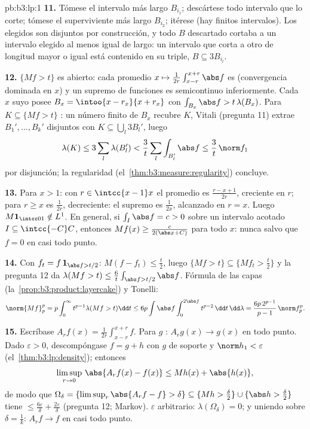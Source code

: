 \begin{solution}{pb:b3:lp:1}
\textbf{11.} Tómese el intervalo más largo $B_{i_1}$; descártese todo
intervalo que lo corte; tómese el superviviente más largo $B_{i_2}$;
itérese (hay finitos intervalos). Los elegidos son disjuntos por
construcción, y todo $B$ descartado cortaba a un intervalo elegido al
menos igual de largo: un intervalo que corta a otro de longitud mayor o
igual está contenido en su triple, $B \subseteq
3B_{i_l}$.

\textbf{12.} $\{Mf > t\}$ es abierto: cada promedio $x \mapsto
\frac1{2r}\int_{x-r}^{x+r}\abs f$ es
 (convergencia dominada en
$x$) y un supremo de funciones
 es semicontinuo
inferiormente. Cada $x$ suyo posee $B_x =
\intoo{x-r_x}{x+r_x}$ con $\int_{B_x}\abs f >
t\,\lambda(B_x)$. Para $K \subseteq \{Mf > t\}$
: un número finito de $B_x$
recubre $K$, Vitali (pregunta 11) extrae $B_1', \dots, B_k'$ disjuntos
con $K \subseteq
\bigcup_l3B_l'$, luego
\[
\lambda(K) \leq 3\sum_l\lambda(B_l') <
\frac3t\sum_l\int_{B_l'}\abs f \leq \frac3t\,\norm f_1
\]
por disjunción; la regularidad 
(el~\cref{thm:b3:measure:regularity}) concluye.

\textbf{13.} Para $x > 1$: con $r \in \intcc{x-1}x$ el promedio es
$\frac{r - x + 1}{2r}$, creciente en $r$; para $r
\geq x$ es $\frac1{2r}$, decreciente: el supremo es $\frac1{2x}$,
alcanzado en $r = x$. Luego $M\mathbf 1_{\intcc01}
\notin L^1$. En general, si $\int_I\abs f = c > 0$ sobre un intervalo
acotado $I \subseteq \intcc{-C}C$, entonces $Mf(x) \geq
\frac{c}{2(\abs x + C)}$ para todo $x$: nunca
 salvo que $f = 0$ en casi todo
punto.

\textbf{14.} Con $f_t = f\,\mathbf 1_{\abs f > t/2}$:
$M(f - f_t) \leq \frac t2$, luego $\{Mf > t\} \subseteq \{Mf_t
> \frac t2\}$ y la pregunta 12 da $\lambda(Mf > t) \leq
\frac6t\int_{\abs f > t/2}\abs f$. Fórmula de las capas
(la~\cref{prop:b3:product:layercake}) y Tonelli:
\[
\norm{Mf}_p^p = p\int_0^\infty t^{p-1}\lambda(Mf > t)\dd t
\leq 6p\int\abs f\int_0^{2\abs f}t^{p-2}\,\dd t\,\dd\lambda
= \frac{6p\,2^{p-1}}{p-1}\,\norm f_p^p .
\]

\textbf{15.} Escríbase $A_rf(x) = \frac1{2r}\int_{x-r}^{x+r}f$. Para $g$
: $A_rg(x) \to g(x)$ en
todo punto. Dado $\varepsilon > 0$, descompóngase $f = g + h$ con $g$
 de soporte
 y $\norm h_1 < \varepsilon$
(el~\cref{thm:b3:lp:density}); entonces
\[
\limsup_{r\to0}\,\abs{A_rf(x) - f(x)} \leq Mh(x) +
\abs{h(x)},
\]
de modo que $\Omega_\delta = \{\limsup_r\abs{A_rf - f} > \delta\}
\subseteq \{Mh > \tfrac\delta2\} \cup \{\abs h >
\tfrac\delta2\}$ tiene 
$\leq \frac{6\varepsilon}\delta
+ \frac{2\varepsilon}\delta$ (pregunta 12; Markov). $\varepsilon$
arbitrario: $\lambda(\Omega_\delta) = 0$; y uniendo sobre
$\delta = \frac1k$: $A_rf \to f$ en casi todo punto.


\end{solution}
